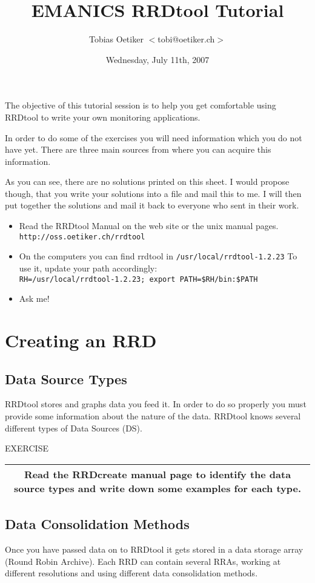 \documentclass[a4paper,12pt]{article}
\title{EMANICS RRDtool Tutorial}
\date{Wednesday, July 11th, 2007}
\author{Tobias Oetiker $<$tobi@oetiker.ch$>$}
\newenvironment{work}{\textsf{\tiny EXERCISE}\nopagebreak\\[0.3ex]\begin{tabular}{|c|}
 \hline
 \begin{minipage}{0.965\linewidth}%
 \setlength{\parskip}{1.6ex plus 0.6ex minus 0.4ex}%
 \rule{0pt}{2.8ex}\ignorespaces}
{\rule[-1.8ex]{0pt}{0pt}\end{minipage}\\
 \hline
 \end{tabular}}
\newcommand{\ex}[1]{\subsection{#1}}
\newcommand{\cmd}[1]{\texttt{\mbox{#1}}}
\begin{document}
\maketitle

The objective of this tutorial session is to help you get comfortable using
RRDtool to write your own monitoring applications.

In order to do some of the exercises you will need information which
you do not have yet. There are three main sources from where you can
acquire this information.

As you can see, there are no solutions printed on this sheet. I would
propose though, that you write your solutions into a file and mail
this to me. I will then put together the solutions and mail it back
to everyone who sent in their work.

\begin{itemize}
\item Read the RRDtool Manual on the web site or the unix manual
  pages.\\ \cmd{http://oss.oetiker.ch/rrdtool}
\item On the computers you can find rrdtool in \cmd{/usr/local/rrdtool-1.2.23}
  To use it, update your path accordingly:\\
\cmd{RH=/usr/local/rrdtool-1.2.23; export PATH=\$RH/bin:\$PATH}
\item Ask me!
\end{itemize}

\newpage
\section{Creating an RRD}
\ex{Data Source Types}

RRDtool stores and graphs data you feed it. In order to do so
properly you must provide some information about the nature of the
data. RRDtool knows several different types of Data Sources (DS).

\begin{work}
  Read the RRDcreate manual page to identify the data source types
  and write down some examples for each type.
\end{work}

\ex{Data Consolidation Methods}

Once you have passed data on to RRDtool it gets stored in a data
storage array (Round Robin Archive). Each RRD can contain several
RRAs, working at different resolutions and using different data
consolidation methods.
\end{document}

